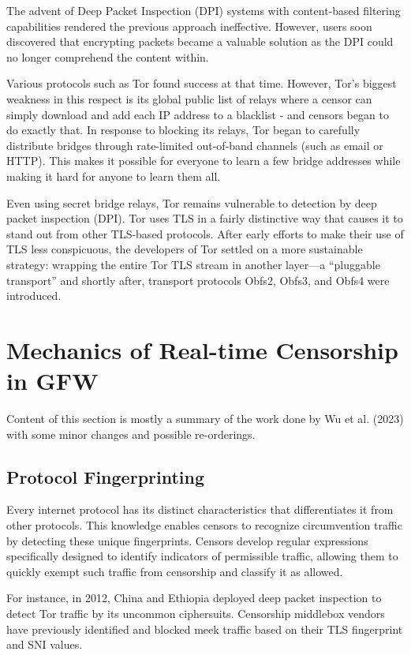 The advent of Deep Packet Inspection (DPI) systems with content-based filtering capabilities rendered the previous approach ineffective. However, users soon discovered that encrypting packets became a valuable solution as the DPI could no longer comprehend the content within.

Various protocols such as Tor found success at that time. However, Tor’s biggest weakness in this respect is its global public list of relays where a censor can simply download and add each IP address to a blacklist - and censors began to do exactly that. In response to blocking its relays, Tor began to carefully distribute bridges through rate-limited out-of-band channels (such as email or HTTP). This makes it possible for everyone to learn a few bridge addresses while making it hard for anyone to learn them all.

Even using secret bridge relays, Tor remains vulnerable to detection by deep packet inspection (DPI). Tor uses TLS in a fairly distinctive way that causes it to stand out from other TLS-based protocols. After early efforts to make their use of TLS less conspicuous, the developers of Tor settled on a more sustainable strategy: wrapping the entire Tor TLS stream in another layer—a “pluggable transport” and shortly after, transport protocols Obfs2, Obfs3, and Obfs4 were introduced.\cite{ensafi2015firewall}

\section{Mechanics of Real-time Censorship in GFW}
Content of this section is mostly a summary of the work done by Wu et al. (2023) with some minor changes  and possible re-orderings.\cite{wu2023great}

\subsection{Protocol Fingerprinting}
Every internet protocol has its distinct characteristics that differentiates it from other protocols. This knowledge enables censors to recognize circumvention traffic by detecting these unique fingerprints. Censors develop regular expressions specifically designed to identify indicators of permissible traffic, allowing them to quickly exempt such traffic from censorship and classify it as allowed.

For instance, in 2012, China and Ethiopia deployed deep packet inspection to detect Tor traffic by its uncommon ciphersuits. Censorship middlebox vendors have previously identified and blocked meek traffic based on their TLS fingerprint and SNI values.\cite{wu2023great}

